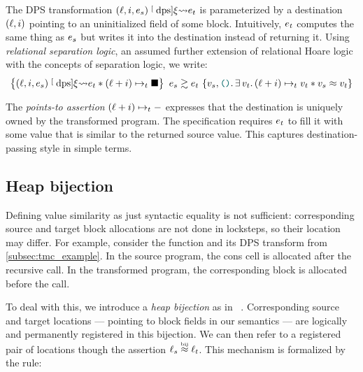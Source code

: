 The DPS transformation $(\datalangLoc, \datalangIdx, \datalangExpr_s) \tmcDps{\datalangRenaming} \datalangExpr_t$ is parameterized by a destination $(\datalangLoc, \datalangIdx)$ pointing to an uninitialized field of some block.
Intuitively, $\datalangExpr_t$ computes the same thing as $\datalangExpr_s$ but writes it into the destination instead of returning it.
Using \emph{relational separation logic}, an assumed further extension of relational Hoare logic with the concepts of separation logic, we write:
\[
    \iSimvHoare{
        (\datalangLoc, \datalangIdx, \datalangExpr_s) \tmcDps{\datalangRenaming} \datalangExpr_t \iSep
        (\datalangLoc + \datalangIdx) \iPointsto_t \datalangHole
    }{
        \datalangVal_s, \datalangUnit \ldotp
        \exists \datalangVal_t \ldotp
        (\datalangLoc + \datalangIdx) \iPointsto_t \datalangVal_t \iSep
        \datalangVal_s \iSimilar \datalangVal_t
    }{
        \datalangExpr_s
    }{
        \datalangExpr_t
    }
\]

The \emph{points-to assertion} $(\datalangLoc + \datalangIdx) \iPointsto_t -$ expresses that the destination is uniquely owned by the transformed program.
The specification requires $\datalangExpr_t$ to fill it with some value that is similar to the returned source value.
This captures destination-passing style in simple terms.

\subsection{Heap bijection}

Defining value similarity as just syntactic equality is not sufficient: corresponding source and target block allocations are not done in locksteps, so their location may differ.
For example, consider the  function and its DPS transform from \cref{subsec:tmc_example}.
In the source program, the cons cell  is allocated after the recursive call.
In the transformed program, the corresponding block is allocated before the call.

To deal with this, we introduce a \emph{heap bijection} as in \Simuliris~\citep*{simuliris-2022}.
Corresponding source and target locations --- pointing to block fields in our semantics --- are logically and permanently registered in this bijection. 
We can then refer to a registered pair of locations though the assertion $\datalangLoc_s \iInBij \datalangLoc_t$.
This mechanism is formalized by the  rule:

